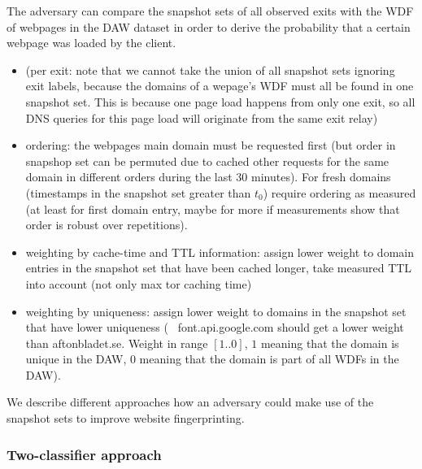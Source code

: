The adversary can compare the snapshot sets of all observed exits with
the WDF of webpages in the DAW dataset in order to derive the
probability that a certain webpage was loaded by the client.

\begin{itemize}
  \item (per exit: note that we cannot take the union of all snapshot
		  sets ignoring exit labels, because the domains of a wepage's
		  WDF must all be found in one snapshot set. This is because one
		  page load happens from only one exit, so all DNS queries for
		  this page load will originate from the same exit relay)
  \item ordering: the webpages main domain must be requested first (but
		  order in snapshop set can be permuted due to cached other
		  requests for the same domain in different orders during the
		  last 30 minutes). For fresh domains (timestamps in the
		  snapshot set greater than $t_0$) require ordering as measured
		  (at least for first domain entry, maybe for more if
		  measurements show that order is robust over repetitions).
  \item weighting by cache-time and TTL information: assign lower weight
		  to domain entries in the snapshot set that have been cached
		  longer, take measured TTL into account (not only max tor
		  caching time)
  \item weighting by uniqueness: assign lower weight to domains in the
		  snapshot set that have lower uniqueness (\eg~
		  font.api.google.com should get a lower weight than
		  aftonbladet.se. Weight in range $[1..0]$, $1$ meaning that the
		  domain is unique in the DAW, $0$ meaning that the domain is
		  part of all WDFs in the DAW).
\end{itemize}

We describe different approaches how an adversary could make use of the
snapshot sets to improve website fingerprinting.

\subsubsection{Two-classifier approach}


